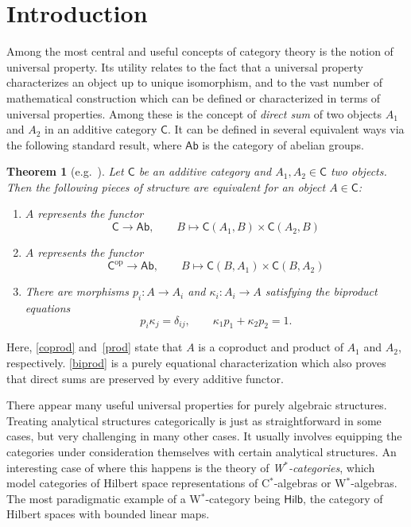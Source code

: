 \documentclass[reqno,T1,11pt]{amsproc}
\newcommand{\op}{\mathrm{op}}
\newcommand{\cat}[1]{\mathsf{#1}}		%
\newcommand{\Hilb}{\mathsf{Hilb}} 		%
\theoremstyle{plain}
\newtheorem{thm}{Theorem}[section]
\theoremstyle{remark}
\numberwithin{equation}{section}
\begin{document}
\section{Introduction}

Among the most central and useful concepts of category theory is the notion of universal property. Its utility relates to the fact that a universal property characterizes an object up to unique isomorphism, and to the vast number of mathematical construction which can be defined or characterized in terms of universal properties. Among these is the concept of \emph{direct sum} of two objects $A_1$ and $A_2$ in an additive category $\cat{C}$. It can be defined in several equivalent ways via the following standard result, where $\cat{Ab}$ is the category of abelian groups.

\begin{thm}[{e.g.~\cite[Proposition~1.2.4]{borceux}}]
\label{directsum_equiv_trad}
Let $\cat{C}$ be an additive category and $A_1,A_2\in\cat{C}$ two objects. Then the following pieces of structure are equivalent for an object $A\in\cat{C}$:
\begin{enumerate}
	\item\label{coprod} $A$ represents the functor
		\[
			\cat{C} \longrightarrow \cat{Ab}, \qquad B \longmapsto \cat{C}(A_1, B) \times \cat{C}(A_2, B)
		\]
    \item\label{prod} $A$ represents the functor
		\[
			\cat{C}^\op \longrightarrow \cat{Ab}, \qquad B \longmapsto \cat{C}(B, A_1) \times \cat{C}(B, A_2)
		\]
	\item\label{biprod} There are morphisms $p_i : A \to A_i$ and $\kappa_i : A_i \to A$ satisfying the \emph{biproduct equations}
	\[
		p_i \kappa_j = \delta_{ij}, \qquad \kappa_1 p_1 + \kappa_2 p_2 = 1.
	\]
\end{enumerate}
\end{thm}

Here, \ref{coprod} and~\ref{prod} state that $A$ is a coproduct and product of $A_1$ and $A_2$, respectively. \ref{biprod} is a purely equational characterization which also proves that direct sums are preserved by every additive functor.

There appear many useful universal properties for purely
algebraic structures.  Treating analytical structures
categorically is just as straightforward in some cases, but very challenging
in many other cases. It usually involves equipping the categories
under consideration themselves with certain analytical structures.
An interesting case of where this happens is the theory of
\emph{W$^*$-categories}, which model categories of Hilbert space
representations of C$^*$-algebras or W$^*$-algebras. The most
paradigmatic example of a W$^*$-category being $\Hilb$, the category
of Hilbert spaces with bounded linear maps.
\end{document}
